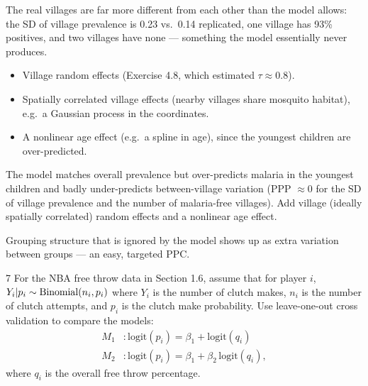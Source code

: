 \documentclass[11pt]{article}
\begin{document}
 The real villages are far more different from each other than the model allows: the SD of village prevalence is 0.23 vs.\ 0.14 replicated, one village has 93\% positives, and two villages have none --- something the model essentially never produces.

\begin{itemize}
\item Village random effects (Exercise 4.8, which estimated $\tau\approx0.8$).
\item Spatially correlated village effects (nearby villages share mosquito habitat), e.g.\ a Gaussian process in the coordinates.
\item A nonlinear age effect (e.g.\ a spline in age), since the youngest children are over-predicted.
\end{itemize}

\begin{answer}
The model matches overall prevalence but over-predicts malaria in the youngest children and badly under-predicts between-village variation (PPP $\approx0$ for the SD of village prevalence and the number of malaria-free villages). Add village (ideally spatially correlated) random effects and a nonlinear age effect.
\end{answer}

\begin{takeaway}
Grouping structure that is ignored by the model shows up as extra variation between groups --- an easy, targeted PPC.
\end{takeaway}


\begin{problem}{7}
For the NBA free throw data in Section 1.6, assume that for player $i$, $Y_i|p_i\sim\mathrm{Binomial}(n_i,p_i)$ where $Y_i$ is the number of clutch makes, $n_i$ is the number of clutch attempts, and $p_i$ is the clutch make probability. Use leave-one-out cross validation to compare the models:
\begin{align*}
M_1&: \mathrm{logit}(p_i)=\beta_1+\mathrm{logit}(q_i)\\
M_2&: \mathrm{logit}(p_i)=\beta_1+\beta_2\,\mathrm{logit}(q_i),
\end{align*}
where $q_i$ is the overall free throw percentage.
\end{problem}
\end{document}
